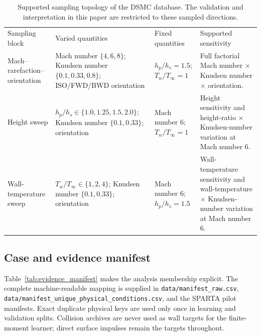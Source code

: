 \documentclass[aip,pof,preprint,notitlepage,floatfix,amsmath,amssymb]{revtex4-2}
\begin{document}
\begin{table}[t]
\centering
\caption{Supported sampling topology of the DSMC database. The validation and interpretation in this paper are restricted to these sampled directions.}
\label{tab:topology}
\small
\begin{ruledtabular}
\begin{tabular}{llll}
Sampling block & Varied quantities & Fixed quantities & Supported sensitivity \\
Mach--rarefaction--orientation & \parbox[t]{0.25\textwidth}{Mach number $\{4,6,8\}$; Knudsen number $\{0.1,0.33,0.8\}$; ISO/FWD/BWD orientation} & \parbox[t]{0.18\textwidth}{$h_p/h_s=1.5$; $T_w/T_\infty=1$} & \parbox[t]{0.25\textwidth}{Full factorial Mach number $\times$ Knudsen number $\times$ orientation.} \\
Height sweep & \parbox[t]{0.25\textwidth}{$h_p/h_s\in\{1.0,1.25,1.5,2.0\}$; Knudsen number $\{0.1,0.33\}$; orientation} & \parbox[t]{0.18\textwidth}{Mach number $6$; $T_w/T_\infty=1$} & \parbox[t]{0.25\textwidth}{Height sensitivity and height-ratio $\times$ Knudsen-number variation at Mach number $6$.} \\
Wall-temperature sweep & \parbox[t]{0.25\textwidth}{$T_w/T_\infty\in\{1,2,4\}$; Knudsen number $\{0.1,0.33\}$; orientation} & \parbox[t]{0.18\textwidth}{Mach number $6$; $h_p/h_s=1.5$} & \parbox[t]{0.25\textwidth}{Wall-temperature sensitivity and wall-temperature $\times$ Knudsen-number variation at Mach number $6$.} \\
\end{tabular}
\end{ruledtabular}
\end{table}

\subsection{Case and evidence manifest}
Table~\ref{tab:evidence_manifest} makes the analysis membership explicit. The complete machine-readable mapping is supplied in \texttt{data/manifest\_raw.csv}, \texttt{data/manifest\_unique\_physical\_conditions.csv}, and the SPARTA pilot manifests. Exact duplicate physical keys are used only once in learning and validation splits. Collision archives are never used as wall targets for the finite-moment learner; direct surface impulses remain the targets throughout.
\end{document}
